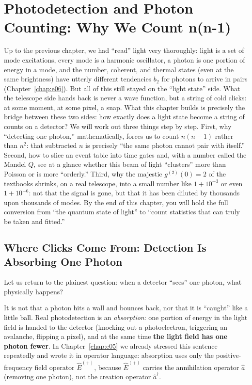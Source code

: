 \chapter{Photodetection and Photon Counting: Why We Count n(n-1)}
\label{chap:e07}

\begin{chapteropening}
Up to the previous chapter, we had ``read'' light very thoroughly: light is a set of mode excitations, every mode is a harmonic oscillator, a photon is one portion of energy in a mode, and the number, coherent, and thermal states (even at the same brightness) have utterly different tendencies \(b_2\) for photons to arrive in pairs (Chapter~\ref{chap:e06}). But all of this still stayed on the ``light state'' side. What the telescope side hands back is never a wave function, but a string of cold clicks: at some moment, at some pixel, a snap. What this chapter builds is precisely the bridge between these two sides: how exactly does a light state become a string of counts on a detector? We will work out three things step by step. First, why ``detecting one photon,'' mathematically, forces us to count \(n(n-1)\) rather than \(n^2\): that subtracted \(n\) is precisely ``the same photon cannot pair with itself.'' Second, how to slice an event table into time gates and, with a number called the Mandel \(Q\), see at a glance whether this beam of light ``clusters'' more than Poisson or is more ``orderly.'' Third, why the majestic \(g^{(2)}(0)=2\) of the textbooks shrinks, on a real telescope, into a small number like \(1+10^{-3}\) or even \(1+10^{-6}\): not that the signal is gone, but that it has been diluted by thousands upon thousands of modes. By the end of this chapter, you will hold the full conversion from ``the quantum state of light'' to ``count statistics that can truly be taken and fitted.''
\end{chapteropening}

\section{Where Clicks Come From: Detection Is Absorbing One Photon}
\label{sec:e07-absorption}

Let us return to the plainest question: when a detector ``sees'' one photon, what physically happens?

It is not that a photon hits a wall and bounces back, nor that it is ``caught'' like a little ball. Real photodetection is an \emph{absorption}: one portion of energy in the light field is handed to the detector (knocking out a photoelectron, triggering an avalanche, flipping a pixel), and at the same time \textbf{the light field has one photon fewer}. In Chapter~\ref{chap:e05} we already stressed this sentence repeatedly and wrote it in operator language: absorption uses only the positive-frequency field operator \(\hat E^{(+)}\), because \(\hat E^{(+)}\) carries the annihilation operator \(\hat a\) (removing one photon), not the creation operator \(\hat a^\dagger\).


